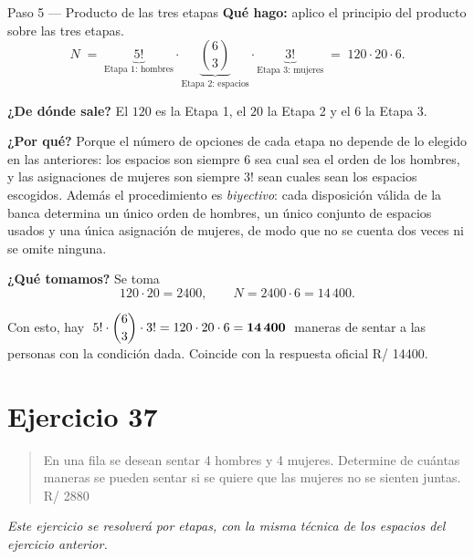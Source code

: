 \documentclass[11pt]{article}
\begin{document}
\begin{paso}{Paso 5 --- Producto de las tres etapas}
\textbf{Qué hago:} aplico el principio del producto sobre las tres etapas.
\[
  N \;=\; \underbrace{5!}_{\text{Etapa 1: hombres}} \cdot \underbrace{\binom{6}{3}}_{\text{Etapa 2: espacios}} \cdot \underbrace{3!}_{\text{Etapa 3: mujeres}} \;=\; 120\cdot 20\cdot 6 .
\]

\textbf{¿De dónde sale?} El $120$ es la Etapa 1, el $20$ la Etapa 2 y el $6$ la Etapa 3.

\textbf{¿Por qué?} Porque el número de opciones de cada etapa no depende de lo elegido en las anteriores: los espacios son siempre $6$ sea cual sea el orden de los hombres, y las asignaciones de mujeres son siempre $3!$ sean cuales sean los espacios escogidos. Además el procedimiento es \emph{biyectivo}: cada disposición válida de la banca determina un único orden de hombres, un único conjunto de espacios usados y una única asignación de mujeres, de modo que no se cuenta dos veces ni se omite ninguna.

\textbf{¿Qué tomamos?} Se toma
\[
  120\cdot 20 = 2400,\qquad N = 2400\cdot 6 = 14\,400 .
\]
\end{paso}

\begin{resp}
Con esto, hay $\;5!\cdot\dbinom{6}{3}\cdot 3! = 120\cdot 20\cdot 6=\mathbf{14\,400}\;$ maneras de sentar a las personas con la condición dada. Coincide con la respuesta oficial R/ 14400.
\end{resp}

\section*{Ejercicio 37}

\begin{quote}
En una fila se desean sentar 4 hombres y 4 mujeres. Determine de cuántas maneras se pueden sentar si se quiere que las mujeres no se sienten juntas. \hfill R/ 2880
\end{quote}

\emph{Este ejercicio se resolverá por etapas, con la misma técnica de los espacios del ejercicio anterior.}
\end{document}
